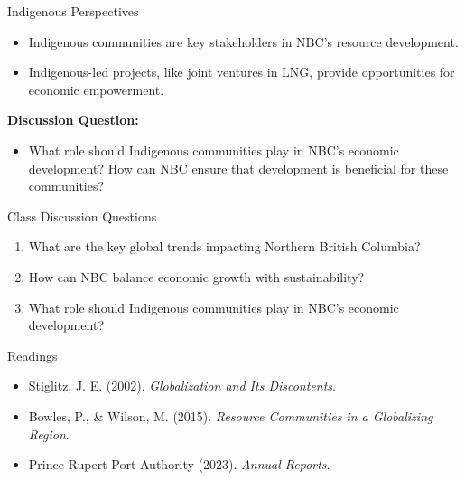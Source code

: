\documentclass{beamer}
\begin{document}
\begin{frame}{Indigenous Perspectives}
    \begin{itemize}
        \item Indigenous communities are key stakeholders in NBC’s resource development.
        \item Indigenous-led projects, like joint ventures in LNG, provide opportunities for economic empowerment.
    \end{itemize}
    \textbf{Discussion Question:}
    \begin{itemize}
        \item What role should Indigenous communities play in NBC’s economic development? How can NBC ensure that development is beneficial for these communities?
    \end{itemize}
\end{frame}

\begin{frame}{Class Discussion Questions}
    \begin{enumerate}
        \item What are the key global trends impacting Northern British Columbia?
        \item How can NBC balance economic growth with sustainability?
        \item What role should Indigenous communities play in NBC’s economic development?
    \end{enumerate}
\end{frame}

\begin{frame}{Readings}
    \begin{itemize}
        \item Stiglitz, J. E. (2002). \textit{Globalization and Its Discontents}.
        \item Bowles, P., \& Wilson, M. (2015). \textit{Resource Communities in a Globalizing Region}.
        \item Prince Rupert Port Authority (2023). \textit{Annual Reports}.
    \end{itemize}
\end{frame}
\end{document}
